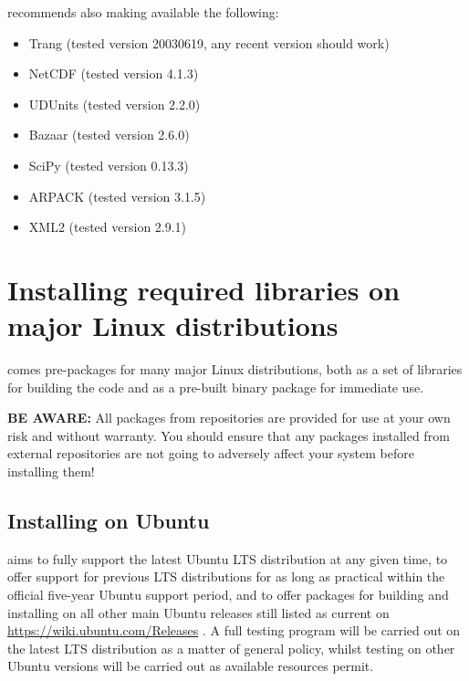 \fluidity recommends also making available the following:

\begin{itemize}
\item Trang (tested version 20030619, any recent version should work)
\item NetCDF (tested version 4.1.3)
\item UDUnits (tested version 2.2.0)
\item Bazaar (tested version 2.6.0)
\item SciPy (tested version 0.13.3)
\item ARPACK (tested version 3.1.5)
\item XML2 (tested version 2.9.1)
\end{itemize}

\section{Installing required libraries on major Linux distributions}
\label{sec:required_libraries_linux}

\fluidity comes pre-packages for many major Linux distributions, both as a set
of libraries for building the code and as a pre-built \fluidity binary package
for immediate use.

\textbf{BE AWARE:} All packages from \fluidity repositories are provided for
use at your own risk and without warranty. You should ensure that any packages
installed from external repositories are not going to adversely affect your
system before installing them!

\subsection{Installing on Ubuntu}
\label{sec:required_libraries_Ubuntu}

\fluidity aims to fully support the latest Ubuntu LTS distribution at any given
time, to offer support for previous LTS distributions for as long as practical
within the official five-year Ubuntu support period, and to offer packages for
building and installing \fluidity on all other main Ubuntu releases still
listed as current on
\href{https://wiki.ubuntu.com/Releases}{https://wiki.ubuntu.com/Releases}
. A full testing program will be carried out on the latest LTS
distribution as a matter of \fluidity general policy, whilst testing on other
Ubuntu versions will be carried out as available resources permit.

